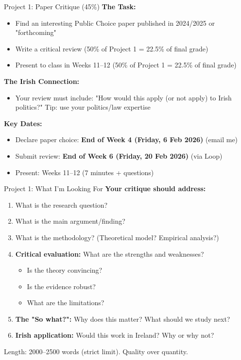 \documentclass[10pt]{beamer}
\begin{document}
\begin{frame}{Project 1: Paper Critique (45\%)}
\textbf{The Task:}
\begin{itemize}
\item Find an interesting Public Choice paper published in 2024/2025 or "forthcoming"
\item Write a critical review (50\% of Project 1 = 22.5\% of final grade)
\item Present to class in Weeks 11--12 (50\% of Project 1 = 22.5\% of final grade)
\end{itemize}

\textbf{The Irish Connection:}
\begin{itemize}
\item Your review must include: "How would this apply (or not apply) to Irish politics?" Tip: use your politics/law expertise
\end{itemize}

\textbf{Key Dates:}
\begin{itemize}
\item Declare paper choice: \textbf{End of Week 4 (Friday, 6 Feb 2026)} (email me)
\item Submit review: \textbf{End of Week 6 (Friday, 20 Feb 2026)} (via Loop)
\item Present: Weeks 11--12 (7 minutes + questions)
\end{itemize}
\end{frame}

\begin{frame}{Project 1: What I'm Looking For}
\textbf{Your critique should address:}
\begin{enumerate}
\item What is the research question?
\item What is the main argument/finding?
\item What is the methodology? (Theoretical model? Empirical analysis?)
\item \textbf{Critical evaluation:} What are the strengths and weaknesses?
\begin{itemize}
\item Is the theory convincing?
\item Is the evidence robust?
\item What are the limitations?
\end{itemize}
\item \textbf{The "So what?":} Why does this matter? What should we study next?
\item \textbf{Irish application:} Would this work in Ireland? Why or why not?
\end{enumerate}


\small{Length: 2000--2500 words (strict limit). Quality over quantity.}
\end{frame}
\end{document}
